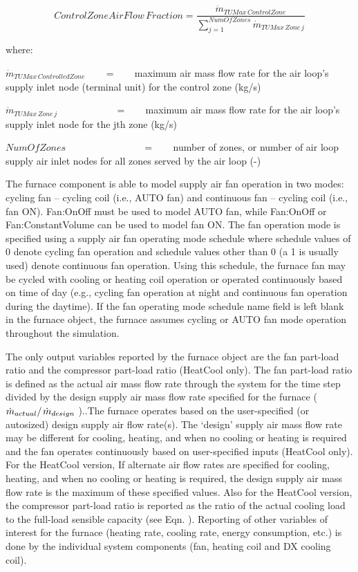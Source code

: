 \begin{equation}
Control Zone Air Flow\,Fraction = \frac{{{{\dot m}_{TUMax\,ControlZone}}}}{{\sum\limits_{j = 1}^{NumOfZones} {{{\dot m}_{TUMax\,Zone\,j}}} }}
\end{equation}

where:

\({\dot m_{TUMax\,ControlledZone}}\) ~~~ = ~~~ maximum air mass flow rate for the air loop's supply inlet node (terminal unit) for the control zone (kg/s)

\({\dot m_{TUMax\,Zone\,j}}\) ~~~~~~~~~~~ = ~~~ maximum air mass flow rate for the air loop's supply inlet node for the jth zone (kg/s)

\(NumOfZones\) ~~~~~~~~~~~~~~~ = ~~~ number of zones, or number of air loop supply air inlet nodes for all zones served by the air loop (-)

The furnace component is able to model supply air fan operation in two modes: cycling fan -- cycling coil (i.e., AUTO fan) and continuous fan -- cycling coil (i.e., fan ON). Fan:OnOff must be used to model AUTO fan, while Fan:OnOff or Fan:ConstantVolume can be used to model fan ON. The fan operation mode is specified using a supply air fan operating mode schedule where schedule values of 0 denote cycling fan operation and schedule values other than 0 (a 1 is usually used) denote continuous fan operation. Using this schedule, the furnace fan may be cycled with cooling or heating coil operation or operated continuously based on time of day (e.g., cycling fan operation at night and continuous fan operation during the daytime). If the fan operating mode schedule name field is left blank in the furnace object, the furnace assumes cycling or AUTO fan mode operation throughout the simulation.

The only output variables reported by the furnace object are the fan part-load ratio and the compressor part-load ratio (HeatCool only). The fan part-load ratio is defined as the actual air mass flow rate through the system for the time step divided by the design supply air mass flow rate specified for the furnace (\({{{{\dot m}_{actual}}} \mathord{\left/ {\vphantom {{{{\dot m}_{actual}}} {{{\dot m}_{design}}}}} \right. } {{{\dot m}_{design}}}}\) )..The furnace operates based on the user-specified (or autosized) design supply air flow rate(s). The `design' supply air mass flow rate may be different for cooling, heating, and when no cooling or heating is required and the fan operates continuously based on user-specified inputs (HeatCool only). For the HeatCool version, If alternate air flow rates are specified for cooling, heating, and when no cooling or heating is required, the design supply air mass flow rate is the maximum of these specified values. Also for the HeatCool version, the compressor part-load ratio is reported as the ratio of the actual cooling load to the full-load sensible capacity (see Eqn. ). Reporting of other variables of interest for the furnace (heating rate, cooling rate, energy consumption, etc.) is done by the individual system components (fan, heating coil and DX cooling coil).

